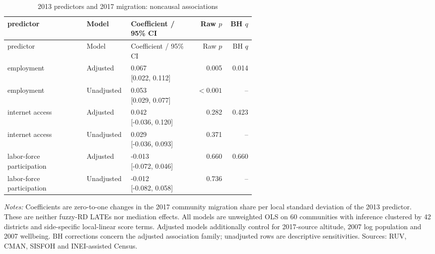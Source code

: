 \begingroup\fontsize{9.25}{11.4}\selectfont\setlength{\tabcolsep}{3pt}
\renewcommand{\arraystretch}{1.18}\begin{longtable}{@{}>{\raggedright\arraybackslash}p{0.32\linewidth}lp{0.26\linewidth}rr@{}}
\caption{2013 predictors and 2017 migration: noncausal associations}\label{tab:pub_A28} \\
\toprule 2013 predictor & Model & Coefficient / 95\% CI & Raw \(p\) & BH \(q\) \\ \midrule\endfirsthead
\toprule 2013 predictor & Model & Coefficient / 95\% CI & Raw \(p\) & BH \(q\) \\ \midrule\endhead
employment & Adjusted & \shortstack[r]{0.067 \\{} [0.022, 0.112]} & 0.005 & 0.014 \\
employment & Unadjusted & \shortstack[r]{0.053 \\{} [0.029, 0.077]} & \(<0.001\) & -- \\
internet access & Adjusted & \shortstack[r]{0.042 \\{} [-0.036, 0.120]} & 0.282 & 0.423 \\
internet access & Unadjusted & \shortstack[r]{0.029 \\{} [-0.036, 0.093]} & 0.371 & -- \\
labor-force participation & Adjusted & \shortstack[r]{-0.013 \\{} [-0.072, 0.046]} & 0.660 & 0.660 \\
labor-force participation & Unadjusted & \shortstack[r]{-0.012 \\{} [-0.082, 0.058]} & 0.736 & -- \\
\bottomrule\end{longtable}{\footnotesize\textit{Notes:} Coefficients are zero-to-one changes in the 2017 community migration share per local standard deviation of the 2013 predictor. These are neither fuzzy-RD LATEs nor mediation effects. All models are unweighted OLS on 60 communities with inference clustered by 42 districts and side-specific local-linear score terms. Adjusted models additionally control for 2017-source altitude, 2007 log population and 2007 wellbeing. BH corrections concern the adjusted association family; unadjusted rows are descriptive sensitivities. Sources: RUV, CMAN, SISFOH and INEI-assisted Census.}\par\endgroup
